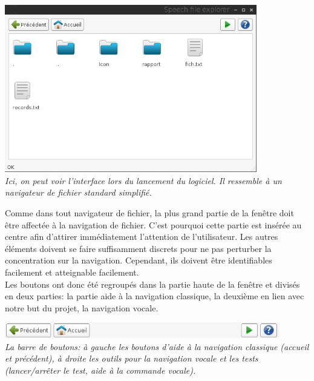 \documentclass[a4paper, 11pt]{report}
\begin{document}
	\begin{center}
		\includegraphics[width=11cm]{explorer}\\
		\emph{Ici, on peut voir l'interface lors du lancement du logiciel. Il ressemble à un navigateur de fichier standard simplifié.\\}
	\end{center}
	
	Comme dans tout navigateur de fichier, la plus grand partie de la fenêtre doit être affectée à la navigation de fichier. C'est pourquoi cette partie est insérée au centre afin d'attirer immédiatement l'attention de l'utilisateur. Les autres éléments doivent se faire suffisamment discrets pour ne pas perturber la concentration sur la navigation. Cependant, ils doivent être identifiables facilement et atteignable facilement.\\
	Les boutons ont donc été regroupés dans la partie haute de la fenêtre et divisés en deux parties: la partie aide à la navigation classique, la deuxième en lien avec notre but du projet, la navigation vocale.\\
	
	\begin{center}
		\includegraphics[width=12cm]{buttons}\\
		\emph{La barre de boutons: à gauche les boutons d'aide à la navigation classique (accueil et précédent), à droite les outils pour la navigation vocale et les tests (lancer/arrêter le test, aide à la commande vocale).\\}
	\end{center}
	
\end{document}
